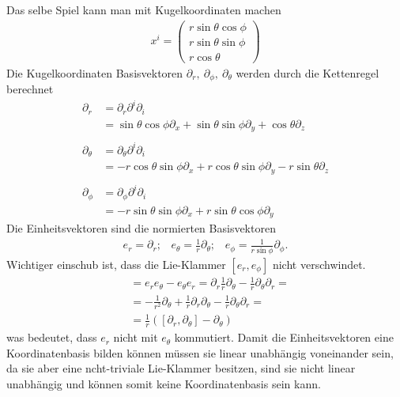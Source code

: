 \documentclass[a4paper]{article}
\begin{document}
Das selbe Spiel kann man mit Kugelkoordinaten machen
\begin{align}
    x^i =
    \begin{pmatrix}
        r\sin\theta\cos\phi\\
        r\sin\theta\sin\phi\\
        r\cos\theta
    \end{pmatrix}
\end{align}
Die Kugelkoordinaten Basisvektoren $\partial _r,\ \partial _\phi,\ \partial
_\theta$ werden durch die Kettenregel berechnet
\begin{align}
    \partial _r &= \partial _r\partial^i\partial_i \\
        &= \sin\theta\cos\phi \partial_x + \sin\theta\sin\phi \partial_y+
        \cos\theta \partial_z\\
        \nonumber\\
        \partial_\theta &= \partial_\theta  \partial^i \partial_i \\
        &=-r\cos\theta \sin\phi \partial_x + r\cos\theta \sin\phi \partial
        _y-r\sin\theta \partial_z\\
        \nonumber\\
        \partial_\phi&= \partial_\phi \partial^i \partial_i \\
        &=-r\sin\theta\sin\phi\partial_x + r\sin\theta\cos\phi \partial_y
\end{align}
Die Einheitsvektoren sind die normierten Basisvektoren
\begin{align}
    e_r = \partial_r;\;\;\; e_\theta = \frac{1}{r}\partial_\theta;\;\;\;
    e_\phi = \frac{1}{r\sin\phi}\partial _\phi.
\end{align}
Wichtiger einschub ist, dass die Lie-Klammer $[e_r, e_\phi]$ nicht
verschwindet.
\begin{align}
    [e_r, e_\theta]&=e_r e_\theta - e_\theta e_r = \partial_r
    \frac{1}{r}\partial_\theta  - \frac{1}{r}\partial_\theta\partial_r =\\
    &=-\frac{1}{r^2}\partial_\theta + \frac{1}{r} \partial_r\partial_\theta
    -\frac{1}{r}\partial_\theta\partial_r=\\
    &=\frac{1}{r}([\partial_r, \partial_\theta] - \partial_\theta)
\end{align}
was bedeutet, dass $e_r$ nicht mit $e_\theta$ kommutiert. Damit die
Einheitsvektoren eine Koordinatenbasis bilden können müssen sie linear
unabhängig voneinander sein, da sie aber eine ncht-triviale Lie-Klammer
besitzen, sind sie nicht linear unabhängig und können somit keine
Koordinatenbasis sein kann.
\end{document}
